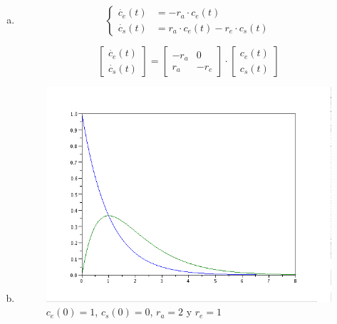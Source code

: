 \documentclass{article}
\begin{document}
\begin{itemize}
	\begin{enumerate}[a)]
\item
\begin{equation}
\left\{ \begin{array}{rl}
  \dot{c_{e}}(t) &= -r_{a} \cdot c_{e}(t) \\
  \dot{c_{s}}(t) &= r_{a} \cdot c_{e}(t) - r_{e} \cdot c_{s}(t)
       \end{array} \right .
 \label{P1.1a} \tag{1.5}
\end{equation}

\begin{equation*}
\begin{bmatrix}
   \dot{c_{e}}(t) \\
   \dot{c_{s}}(t) 
 \end{bmatrix}
=
\begin{bmatrix}
   - r_{a} & 0 \\
     r_{a} & -r_{e}
\end{bmatrix} 
\cdot 
\begin{bmatrix}
   c_{e}(t) \\
   c_{s}(t) 
\end{bmatrix}
\end{equation*}

\item
\begin{figure}[H]
\includegraphics[width=\textwidth]{img/ej02-b.png}
\caption{$c_{e}(0)=1$, $c_{s}(0)=0$, $r_{a}=2$ y $r_{e}=1$ }
\end{figure}


\end{enumerate}
\end{itemize}
\end{document}
